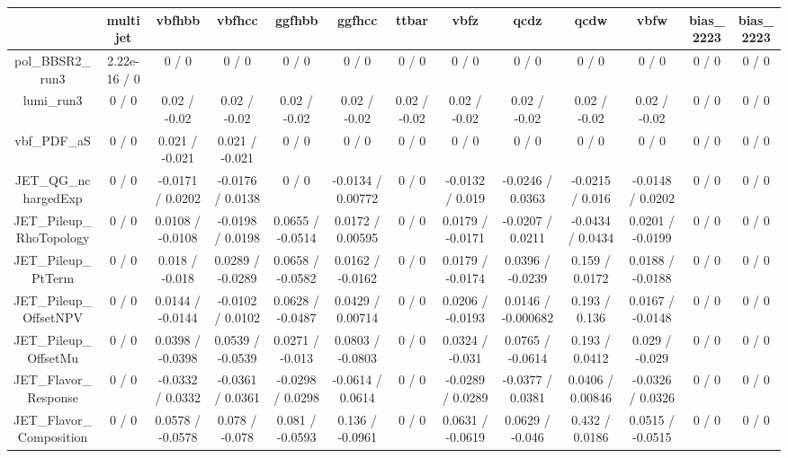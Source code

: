\documentclass[10pt]{article}
\begin{document}
\begin{table}[htbp]
\begin{center}
\begin{tabular}{|c|c|c|c|c|c|c|c|c|c|c|c|c|}
\hline 
      & multijet      & vbfhbb      & vbfhcc      & ggfhbb      & ggfhcc      & ttbar      & vbfz      & qcdz      & qcdw      & vbfw      & bias_2223      & bias_2223 \\ 
\hline 
  pol_BBSR2_run3 & 2.22e-16 / 0 & 0 / 0 & 0 / 0 & 0 / 0 & 0 / 0 & 0 / 0 & 0 / 0 & 0 / 0 & 0 / 0 & 0 / 0 & 0 / 0 & 0 / 0 \\ 
  lumi_run3 & 0 / 0 & 0.02 / -0.02 & 0.02 / -0.02 & 0.02 / -0.02 & 0.02 / -0.02 & 0.02 / -0.02 & 0.02 / -0.02 & 0.02 / -0.02 & 0.02 / -0.02 & 0.02 / -0.02 & 0 / 0 & 0 / 0 \\ 
  vbf_PDF_aS & 0 / 0 & 0.021 / -0.021 & 0.021 / -0.021 & 0 / 0 & 0 / 0 & 0 / 0 & 0 / 0 & 0 / 0 & 0 / 0 & 0 / 0 & 0 / 0 & 0 / 0 \\ 
  JET_QG_nchargedExp & 0 / 0 & -0.0171 / 0.0202 & -0.0176 / 0.0138 & 0 / 0 & -0.0134 / 0.00772 & 0 / 0 & -0.0132 / 0.019 & -0.0246 / 0.0363 & -0.0215 / 0.016 & -0.0148 / 0.0202 & 0 / 0 & 0 / 0 \\ 
  JET_Pileup_RhoTopology & 0 / 0 & 0.0108 / -0.0108 & -0.0198 / 0.0198 & 0.0655 / -0.0514 & 0.0172 / 0.00595 & 0 / 0 & 0.0179 / -0.0171 & -0.0207 / 0.0211 & -0.0434 / 0.0434 & 0.0201 / -0.0199 & 0 / 0 & 0 / 0 \\ 
  JET_Pileup_PtTerm & 0 / 0 & 0.018 / -0.018 & 0.0289 / -0.0289 & 0.0658 / -0.0582 & 0.0162 / -0.0162 & 0 / 0 & 0.0179 / -0.0174 & 0.0396 / -0.0239 & 0.159 / 0.0172 & 0.0188 / -0.0188 & 0 / 0 & 0 / 0 \\ 
  JET_Pileup_OffsetNPV & 0 / 0 & 0.0144 / -0.0144 & -0.0102 / 0.0102 & 0.0628 / -0.0487 & 0.0429 / 0.00714 & 0 / 0 & 0.0206 / -0.0193 & 0.0146 / -0.000682 & 0.193 / 0.136 & 0.0167 / -0.0148 & 0 / 0 & 0 / 0 \\ 
  JET_Pileup_OffsetMu & 0 / 0 & 0.0398 / -0.0398 & 0.0539 / -0.0539 & 0.0271 / -0.013 & 0.0803 / -0.0803 & 0 / 0 & 0.0324 / -0.031 & 0.0765 / -0.0614 & 0.193 / 0.0412 & 0.029 / -0.029 & 0 / 0 & 0 / 0 \\ 
  JET_Flavor_Response & 0 / 0 & -0.0332 / 0.0332 & -0.0361 / 0.0361 & -0.0298 / 0.0298 & -0.0614 / 0.0614 & 0 / 0 & -0.0289 / 0.0289 & -0.0377 / 0.0381 & 0.0406 / 0.00846 & -0.0326 / 0.0326 & 0 / 0 & 0 / 0 \\ 
  JET_Flavor_Composition & 0 / 0 & 0.0578 / -0.0578 & 0.078 / -0.078 & 0.081 / -0.0593 & 0.136 / -0.0961 & 0 / 0 & 0.0631 / -0.0619 & 0.0629 / -0.046 & 0.432 / 0.0186 & 0.0515 / -0.0515 & 0 / 0 & 0 / 0 \\ 

\end{tabular}
\end{center}
\end{table}
\end{document}
